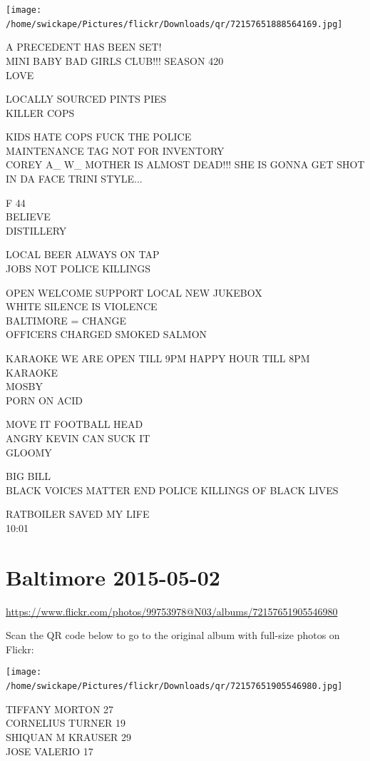 \documentclass[10pt,letterpaper]{article}
\begin{document}
\texttt{[image: /home/swickape/Pictures/flickr/Downloads/qr/72157651888564169.jpg]}
\

A PRECEDENT HAS BEEN SET!\\
MINI BABY BAD GIRLS CLUB!!! SEASON 420\\
LOVE

LOCALLY SOURCED PINTS PIES\\
KILLER COPS

KIDS HATE COPS FUCK THE POLICE\\
MAINTENANCE TAG NOT FOR INVENTORY\\
COREY A\_ W\_ MOTHER IS ALMOST DEAD!!!  SHE IS GONNA GET SHOT IN DA FACE TRINI STYLE...

F 44\\
BELIEVE\\
DISTILLERY

LOCAL BEER ALWAYS ON TAP\\
JOBS NOT POLICE KILLINGS

OPEN WELCOME SUPPORT LOCAL NEW JUKEBOX\\
WHITE SILENCE IS VIOLENCE\\
BALTIMORE = CHANGE\\
OFFICERS CHARGED SMOKED SALMON

KARAOKE WE ARE OPEN TILL 9PM HAPPY HOUR TILL 8PM KARAOKE\\
MOSBY\\
PORN ON ACID

MOVE IT FOOTBALL HEAD\\
ANGRY KEVIN CAN SUCK IT\\
GLOOMY

BIG BILL\\
BLACK VOICES MATTER END POLICE KILLINGS OF BLACK LIVES

RATBOILER SAVED MY LIFE\\
10:01
\

\section*{Baltimore 2015-05-02}

\url{https://www.flickr.com/photos/99753978@N03/albums/72157651905546980}

Scan the QR code below to go to the original album with full-size photos on Flickr:

\texttt{[image: /home/swickape/Pictures/flickr/Downloads/qr/72157651905546980.jpg]}
\

TIFFANY MORTON 27\\
CORNELIUS TURNER 19\\
SHIQUAN M KRAUSER 29\\
JOSE VALERIO 17
\end{document}
